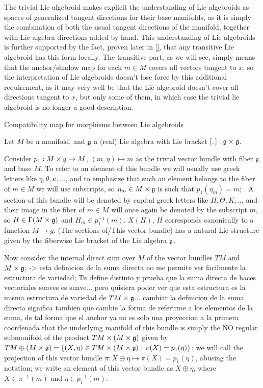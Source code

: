 The trivial Lie algebroid makes explicit the understanding of Lie algebroids as spaces of generalized tangent directions for their base manifolds, as it is simply the combination of both the usual tangent directions of the manifold, together with Lie algebra directions added by hand. This understanding of Lie algebroids is further supported by the fact, proven later in \ref{}, that any transitive Lie algebroid has this form locally. The transitive part, as we will see, simply means that the anchor/shadow map for each $m \in M$ covers all vectors tangent to $x$, so the interpretation of Lie algebroids doesn't lose force by this additional requirement, as it may very well be that the Lie algebroid doesn't cover all directions tangent to $x$, but only some of them, in which case the trivial lie algebroid is no longer a good description.

Compatibility map for morphisms between Lie algebroids

Let $M$ be a manifold, and $\mathfrak{g}$ a (real) Lie algebra with Lie bracket $[,]: \mathfrak{g} \times \mathfrak{g}$. 

Consider $p_1: M \times \mathfrak{g} \to M$, $(m, \eta) \mapsto m$ as the trivial vector bundle with fiber $\mathfrak{g}$ and base $M$. To refer to an element of this bundle we will usually use greek letters like $\eta, \theta, \kappa, \dots$, and to emphasize that such an element belongs to the fiber of $m \in M$ we will use subscripts, so $\eta_m \in M \times \mathfrak{g}$ is such that $p_1(\eta_m) = m$; . A section of this bundle will be denoted by capital greek letters like $H, \Theta, K, \dots$ and their image in the fiber of $m \in M$ will once again be denoted by the subscript $m$, so $H \in \Gamma(M \times \mathfrak{g})$ and $H_m \in p_1^{-1}(m)$. $X(H)$, $H$ corresponds canonically to a function $M \to g$. (The sections of/This vector bundle) has a natural Lie structure given by the fiberwise Lie bracket of the Lie algebra $\mathfrak{g}$.

Now consider the internal direct sum over $M$ of the vector bundles $TM$ and $M \times \mathfrak{g}$; -> esta definicion de la suma directa no me permite ver facilmente la estructura de variedad; Tu define distinto y prueba que la suma directa de haces vectoriales suaves es suave... pero quisiera poder ver que esta estructura es la misma estructura de variedad de $TM \times \mathfrak{g}$... cambiar la definicion de la suma directa significa tambien que cambie la forma de referirme a los elementos de la suma, de tal forma que el anchor ya no es solo una proyeccion a la primera coordenada  that the underlying manifold of this bundle is simply the NO regular submanifold of the product $TM \times (M \times \mathfrak{g})$ given by $TM \oplus (M \times \mathfrak{g}) = \{(X, \eta) \in TM \times (M \times \mathfrak{g}) \operatorname{\,|\,} \pi(X) = p_1(\eta)\}$; we will call the projection of this vector bundle $\pi: X \oplus \eta \mapsto \pi(X) = p_1(\eta)$, abusing the notation; we write an element of this vector bundle as $X \oplus \eta$, where $X \in \pi^{-1}(m)$ and $\eta \in p_1^{-1}(m)$.

